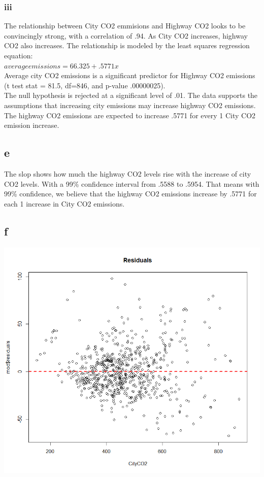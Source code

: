 \documentclass[10pt,letterpaper]{article}
\begin{document}
\subsubsection*{iii}
The relationship between City CO2 emmisions and Highway CO2 looks to be convincingly
strong, with a correlation of .94. As City CO2 increases, highway CO2 also increases.
The relationship is modeled by the least squares regression equation:\\
$average emissions = 66.325 + .5771x$\\
Average city CO2 emissions is a significant predictor for Highway CO2 emissions
(t test stat = 81.5, df=846, and p-value .00000025).\\
The null hypothesis is rejected at a significant level of .01. The data supports
the assumptions that increasing city emissions may increase highway CO2 emissions.
The highway CO2 emissions are expected to increase .5771 for every 1 City CO2 emission
increase. 

\subsection*{e}
The slop shows how much the highway CO2 levels rise with the increase of city
CO2 levels. With a 99\% confidence interval from .5588 to .5954. That means
with 99\% confidence, we believe that the highway CO2 emissions increase
by .5771 for each 1 increase in City CO2 emissions. 

\subsection*{f}
\includegraphics[scale=.6]{residuals}
\end{document}
